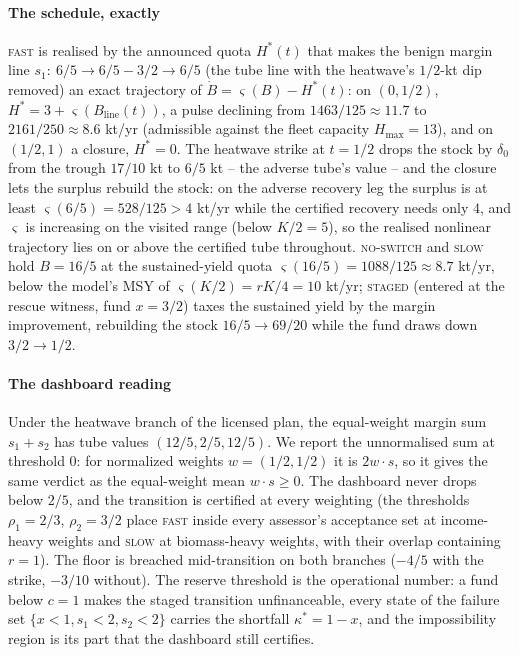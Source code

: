 \documentclass[preprint,11pt,authoryear]{elsarticle}
\theoremstyle{remark}
\newcommand{\act}[1]{\textsc{#1}}
\begin{document}
\paragraph{The schedule, exactly} \act{fast} is realised by the announced quota $H^*(t)$ that makes the benign margin line $s_1:\ 6/5\to6/5-3/2\to6/5$ (the tube line with the heatwave's $1/2$-kt dip removed) an exact trajectory of $\dot B=\varsigma(B)-H^*(t)$: on $(0,1/2)$, $H^*=3+\varsigma(B_{\mathrm{line}}(t))$, a pulse declining from $1463/125\approx11.7$ to $2161/250\approx8.6$ kt/yr (admissible against the fleet capacity $H_{\max}=13$), and on $(1/2,1)$ a closure, $H^*=0$. The heatwave strike at $t=1/2$ drops the stock by $\delta_0$ from the trough $17/10$ kt to $6/5$ kt -- the adverse tube's value -- and the closure lets the surplus rebuild the stock: on the adverse recovery leg the surplus is at least $\varsigma(6/5)=528/125>4$ kt/yr while the certified recovery needs only $4$, and $\varsigma$ is increasing on the visited range (below $K/2=5$), so the realised nonlinear trajectory lies on or above the certified tube throughout. \act{no-switch} and \act{slow} hold $B=16/5$ at the sustained-yield quota $\varsigma(16/5)=1088/125\approx8.7$ kt/yr, below the model's MSY of $\varsigma(K/2)=rK/4=10$ kt/yr; \act{staged} (entered at the rescue witness, fund $x=3/2$) taxes the sustained yield by the margin improvement, rebuilding the stock $16/5\to69/20$ while the fund draws down $3/2\to1/2$.

\paragraph{The dashboard reading} Under the heatwave branch of the licensed plan, the equal-weight margin sum $s_1+s_2$ has tube values $(12/5,2/5,12/5)$. We report the unnormalised sum at threshold $0$: for normalized weights $w=(1/2,1/2)$ it is $2w\cdot s$, so it gives the same verdict as the equal-weight mean $w\cdot s\ge0$. The dashboard never drops below $2/5$, and the transition is certified at every weighting (the thresholds $\rho_1=2/3$, $\rho_2=3/2$ place \act{fast} inside every assessor's acceptance set at income-heavy weights and \act{slow} at biomass-heavy weights, with their overlap containing $r=1$). The floor is breached mid-transition on both branches ($-4/5$ with the strike, $-3/10$ without). The reserve threshold is the operational number: a fund below $c=1$ makes the staged transition unfinanceable, every state of the failure set $\{x<1,s_1<2,s_2<2\}$ carries the shortfall $\kappa^*=1-x$, and the impossibility region is its part that the dashboard still certifies.
\end{document}
